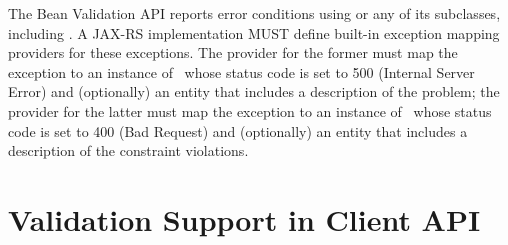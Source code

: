 The Bean Validation API reports error conditions using  or any of its subclasses, including . A JAX-RS implementation MUST define built-in exception mapping providers for these exceptions. The provider for the former must map the exception to an instance of \Response\ whose status code is set to 500 (Internal Server Error) and (optionally) an entity that includes a description of the problem; the provider for the latter must map the exception to an instance of \Response\ whose status code is set to 400 (Bad Request) and (optionally) an entity that includes a description of the constraint violations.


\section{Validation Support in Client API}
